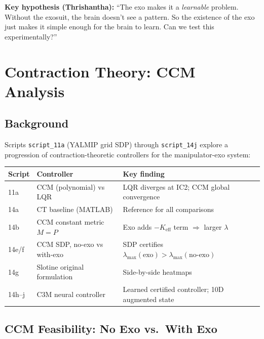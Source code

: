 \documentclass[11pt, a4paper]{article}
\newcommand{\Ke}{K_{\mathrm{eff}}}
\begin{document}
\begin{infobox}
\textbf{Key hypothesis (Thrishantha):} ``The exo makes it a \emph{learnable} problem.
Without the exosuit, the brain doesn't see a pattern. So the existence of the exo just
makes it simple enough for the brain to learn. Can we test this experimentally?''
\end{infobox}

\section{Contraction Theory: CCM Analysis}

\subsection{Background}

Scripts \texttt{script\_11a} (YALMIP grid SDP) through \texttt{script\_14j} explore a
progression of contraction-theoretic controllers for the manipulator-exo system:

\begin{center}
{\small
\begin{tabular}{lll}
\toprule
\textbf{Script} & \textbf{Controller} & \textbf{Key finding} \\
\midrule
11a  & CCM (polynomial) vs LQR & LQR diverges at IC2; CCM global convergence \\
14a  & CT baseline (MATLAB)    & Reference for all comparisons \\
14b  & CCM constant metric $M=P$  & Exo adds $-\Ke$ term $\Rightarrow$ larger $\lambda$ \\
14e/f & CCM SDP, no-exo vs with-exo & SDP certifies $\lambda_{\max}(\text{exo}) > \lambda_{\max}(\text{no-exo})$ \\
14g  & Slotine original formulation & Side-by-side heatmaps \\
14h--j & C3M neural controller     & Learned certified controller; 10D augmented state \\
\bottomrule
\end{tabular}
}
\end{center}

\subsection{CCM Feasibility: No Exo vs.\ With Exo}
\end{document}
